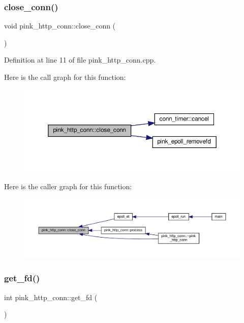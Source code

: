 \subsubsection{\texorpdfstring{close\+\_\+conn()}{close\_conn()}}
{\footnotesize\ttfamily void pink\+\_\+http\+\_\+conn\+::close\+\_\+conn (\begin{DoxyParamCaption}{ }\end{DoxyParamCaption})}



Definition at line 11 of file pink\+\_\+http\+\_\+conn.\+cpp.

Here is the call graph for this function\+:\nopagebreak
\begin{figure}[H]
\begin{center}
\leavevmode
\includegraphics[width=350pt]{classpink__http__conn_abdcd7c0da8072d62cb7212523f20298b_cgraph}
\end{center}
\end{figure}
Here is the caller graph for this function\+:
\nopagebreak
\begin{figure}[H]
\begin{center}
\leavevmode
\includegraphics[width=350pt]{classpink__http__conn_abdcd7c0da8072d62cb7212523f20298b_icgraph}
\end{center}
\end{figure}
\mbox{\label{classpink__http__conn_aa304899ec9a7f6d7a2a9d738309a9570}} 
\subsubsection{\texorpdfstring{get\+\_\+fd()}{get\_fd()}}
{\footnotesize\ttfamily int pink\+\_\+http\+\_\+conn\+::get\+\_\+fd (\begin{DoxyParamCaption}{ }\end{DoxyParamCaption})}




